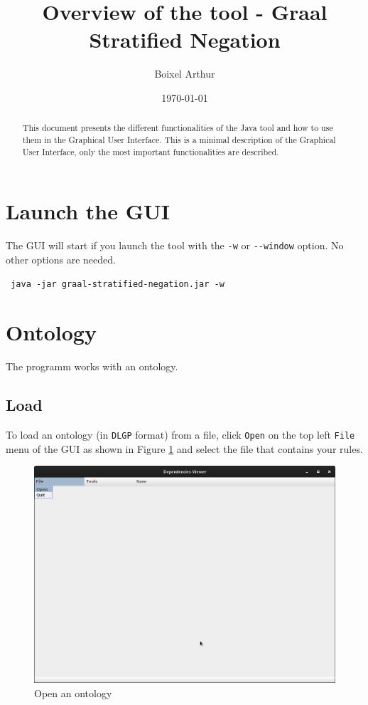 \documentclass[a4paper, 10pt]{article}
\title{Overview of the tool - Graal Stratified Negation}
\author{Boixel Arthur}
\date{\today}
\begin{document}
\maketitle

\begin{abstract}
  This document presents the different functionalities of the Java tool and how to use them in the Graphical User Interface. This is a minimal description of the Graphical User Interface, only the most important functionalities are described.
\end{abstract}

\newpage

\tableofcontents

\newpage
\section{Launch the GUI}
The GUI will start if you launch the tool with the \verb=-w= or \verb=--window= option. No other options are needed.\\
\begin{center}
  \verb= java -jar graal-stratified-negation.jar -w=
\end{center}


\section{Ontology}
The programm works with an ontology.
\subsection{Load}
To load an ontology (in \verb=DLGP= format) from a file, click \verb=Open= on the top left \verb=File= menu of the GUI as shown in Figure \ref{fig1} and select the file that contains your rules.
\begin{figure}
  \begin{center}
    \includegraphics[scale=0.25]{pics/fig1.png}
    \caption{Open an ontology}
  \end{center}
  \label{fig1}
\end{figure}
\end{document}
